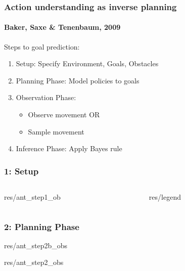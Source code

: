 \documentclass[11pt]{beamer}
\begin{document}
\begin{frame}
	\frametitle{Action understanding as inverse planning}
	\framesubtitle{Baker, Saxe \& Tenenbaum, 2009}
	
	Steps to goal prediction:
	\begin{enumerate}
		\item Setup: Specify Environment, Goals, Obstacles
		\item Planning Phase: Model policies to goals
		\item Observation Phase:
		\begin{itemize}
			\item Observe movement OR
			\item Sample movement
		\end{itemize}
		\item Inference Phase:
		Apply Bayes rule
	\end{enumerate}
\end{frame}

\begin{frame}
	\frametitle{1: Setup}
	\begin{columns}
		\begin{column}{0.7\textwidth}
				\begin{overpic}[width=0.95\textwidth,tics=10]{res/ant_step1_ob}
		\end{overpic}
	\end{column}
		\begin{column}{0.3\textwidth}
	\begin{overpic}[width=1.0\textwidth,tics=10]{res/legend}
	\end{overpic}
\end{column}
	\end{columns}
\end{frame}

\begin{frame}
	\frametitle{2: Planning Phase}
	\begin{overpic}[width=0.48\textwidth,tics=10]{res/ant_step2b_obs}
	\end{overpic}
	\begin{overpic}[width=.48\textwidth,tics=10]{res/ant_step2_obs}
	\end{overpic}
\end{frame}
\end{document}
